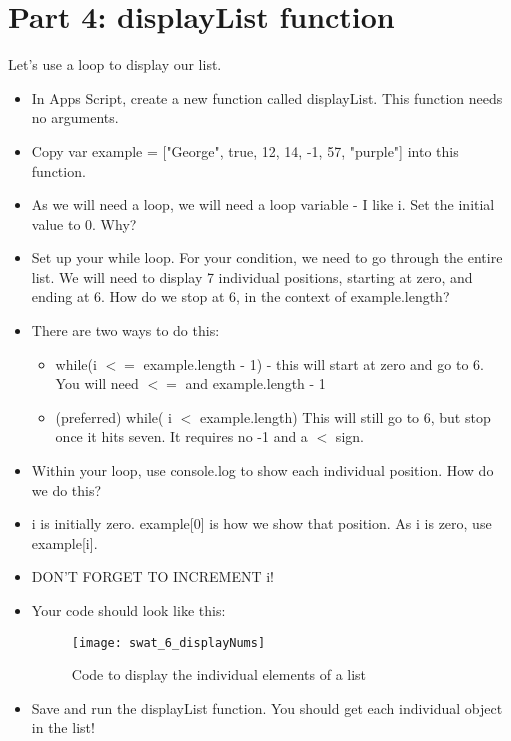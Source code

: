 \documentclass{article}
\begin{document}
\section*{Part 4: displayList function}
Let's use a loop to display our list.
\begin{itemize}
    \item In Apps Script, create a new function called displayList.  This function needs no arguments.
    \item Copy var example = ["George", true, 12, 14, -1, 57, "purple"] into this function.
    \item As we will need a loop, we will need a loop variable - I like i.  Set the initial value to 0.  Why?
    \item Set up your while loop.  For your condition, we need to go through the entire list.  We will need to display 7 individual positions, starting at zero, and ending at 6.  How do we stop at 6, in the context of example.length?
    \item There are two ways to do this:
    \begin{itemize}
    		\item while(i $<=$ example.length - 1) - this will start at zero and go to 6.  You will need $<=$ and example.length - 1
    		\item (preferred) while( i $<$ example.length) This will still go to 6, but stop once it hits seven.  It requires no -1 and a $<$ sign.
    	\end{itemize}
    	\item Within your loop, use console.log to show each individual position.  How do we do this?
    	\item i is initially zero.  example[0] is how we show that position.  As i is zero, use example[i].
    	\item DON'T FORGET TO INCREMENT i!
    	\item Your code should look like this:
    	\begin{figure}[H]
  		\centering
  		\texttt{[image: swat\_6\_displayNums]}
  		\caption{Code to display the individual elements of a list}
	\end{figure}
	\item Save and run the displayList function.  You should get each individual object in the list!
\end{itemize}
\end{document}
